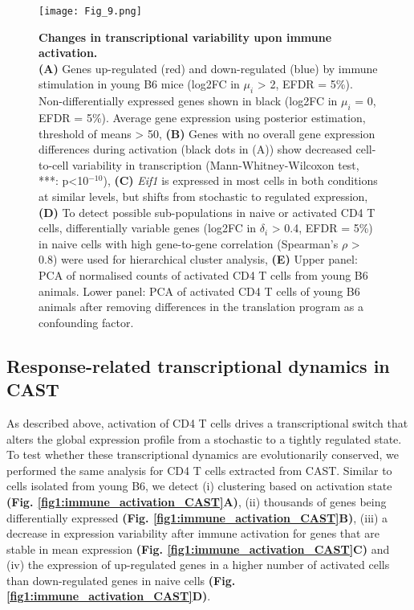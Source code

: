 \begin{figure}[!ht]
\centering
\texttt{[image: Fig\_9.png]}
\caption[Changes in transcriptional variability upon immune activation]{\textbf{Changes in transcriptional variability upon immune activation.}\\
\textbf{(A)} Genes up-regulated (red) and down-regulated (blue) by immune stimulation in young B6 mice (log2FC in $\mu_i$ > 2, EFDR = 5\%). Non-differentially expressed genes shown in black (log2FC in $\mu_i$ = 0, EFDR = 5\%). Average gene expression using posterior estimation, threshold of means > 50, \textbf{(B)} Genes with no overall gene expression differences during activation (black dots in (A)) show decreased cell-to-cell variability in transcription (Mann-Whitney-Wilcoxon test, ***: p<10$^{-10}$), \textbf{(C)} \textit{Eif1} is expressed in most cells in both conditions at similar levels, but shifts from stochastic to regulated expression, \textbf{(D)} To detect possible sub-populations in naive or activated CD4\plus{} T cells, differentially variable genes (log2FC in $\delta_i$ > 0.4, EFDR = 5\%) in naive cells with high gene-to-gene correlation (Spearman’s $\rho$ > 0.8) were used for hierarchical cluster analysis, \textbf{(E)} Upper panel: PCA of normalised counts of activated CD4\plus{} T cells from young B6 animals. Lower panel: PCA of activated CD4\plus{} T cells of young B6 animals after removing differences in the translation program as a confounding factor.}
\label{fig1:immune_variability}
\end{figure}

\newpage


\subsection{Response-related transcriptional dynamics in CAST}

As described above, activation of CD4\plus{} T cells drives a transcriptional switch that alters the global expression profile from a stochastic to a tightly regulated state. To test whether these transcriptional dynamics are evolutionarily conserved, we performed the same analysis for CD4\plus{} T cells extracted from CAST. Similar to cells isolated from young B6, we detect (i) clustering based on activation state \textbf{(Fig. \ref{fig1:immune_activation_CAST}A)}, (ii)  thousands of genes being differentially expressed \textbf{(Fig. \ref{fig1:immune_activation_CAST}B)}, (iii) a decrease in expression variability after immune activation for genes that are stable in mean expression \textbf{(Fig. \ref{fig1:immune_activation_CAST}C)} and (iv) the expression of up-regulated genes in a higher number of activated cells than down-regulated genes in naive cells \textbf{(Fig. \ref{fig1:immune_activation_CAST}D)}.

